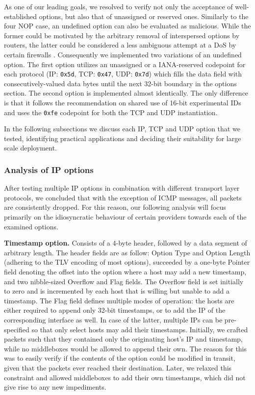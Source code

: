 As one of our leading goals, we resolved to verify not only the acceptance of well-established options, but also that of unassigned or reserved ones. Similarly to the four NOP case, an undefined option can also be evaluated as malicious. While the former could be motivated by the arbitrary removal of interspersed options by routers, the latter could be considered a less ambiguous attempt at a DoS by certain firewalls \cite{I-D.ietf-tsvwg-udp-options}. Consequently we implemented two variations of an undefined option. The first option utilizes an unassigned or a IANA-reserved codepoint for each protocol (IP: \texttt{0x5d}, TCP: \texttt{0x47}, UDP: \texttt{0x7d}) which fills the data field with consecutively-valued data bytes until the next 32-bit boundary in the options section. The second option is implemented almost identically. The only difference is that it follows the recommendation on shared use of 16-bit experimental IDs and uses the \texttt{0xfe} codepoint for both the TCP and UDP instantiation.

In the following subsections we discuss each IP, TCP and UDP option that we tested, identifying practical applications and deciding their suitability for large scale deployment.


\subsubsection{Analysis of IP options}
\label{extend:ops:evaluation:ip-ops}

After testing multiple IP options in combination with different transport layer protocols, we concluded that with the exception of ICMP messages, all packets are consistently dropped. For this reason, our following analysis will focus primarily on the idiosyncratic behaviour of certain providers towards each of the examined options.

\textbf{Timestamp option.} Consists of a 4-byte header, followed by a data segment of arbitrary length. The header fields are as follow: Option Type and Option Length (adhering to the TLV encoding of most options), succeeded by a one-byte Pointer field denoting the offset into the option where a host may add a new timestamp, and two nibble-sized Overflow and Flag fields. The Overflow field is set initially to zero and is incremented by each host that is willing but unable to add a timestamp. The Flag field defines multiple modes of operation: the hosts are either required to append only 32-bit timestamps, or to add the IP of the corresponding interface as well. In case of the latter, multiple IPs can be pre-specified so that only select hosts may add their timestamps. Initially, we crafted packets such that they contained only the originating host's IP and timestamp, while no middleboxes would be allowed to append their own. The reason for this was to easily verify if the contents of the option could be modified in transit, given that the packets ever reached their destination. Later, we relaxed this constraint and allowed middleboxes to add their own timestamps, which did not give rise to any new impediments.

